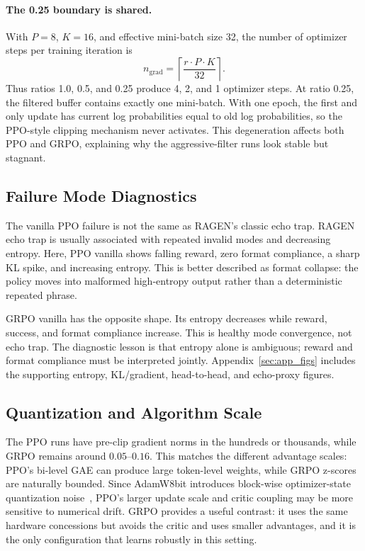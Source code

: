 \paragraph{The 0.25 boundary is shared.}
With \(P=8\), \(K=16\), and effective mini-batch size 32, the number of optimizer steps per training iteration is
\begin{equation}
n_{\mathrm{grad}} =
\left\lceil \frac{r \cdot P \cdot K}{32} \right\rceil.
\end{equation}
Thus ratios 1.0, 0.5, and 0.25 produce 4, 2, and 1 optimizer steps. At ratio 0.25, the filtered buffer contains exactly one mini-batch. With one epoch, the first and only update has current log probabilities equal to old log probabilities, so the PPO-style clipping mechanism never activates. This degeneration affects both PPO and GRPO, explaining why the aggressive-filter runs look stable but stagnant.

\subsection{Failure Mode Diagnostics}

The vanilla PPO failure is not the same as RAGEN's classic echo trap. RAGEN echo trap is usually associated with repeated invalid modes and decreasing entropy. Here, PPO vanilla shows falling reward, zero format compliance, a sharp KL spike, and increasing entropy. This is better described as format collapse: the policy moves into malformed high-entropy output rather than a deterministic repeated phrase.

GRPO vanilla has the opposite shape. Its entropy decreases while reward, success, and format compliance increase. This is healthy mode convergence, not echo trap. The diagnostic lesson is that entropy alone is ambiguous; reward and format compliance must be interpreted jointly. Appendix~\ref{sec:app_figs} includes the supporting entropy, KL/gradient, head-to-head, and echo-proxy figures.

\subsection{Quantization and Algorithm Scale}

The PPO runs have pre-clip gradient norms in the hundreds or thousands, while GRPO remains around \(0.05\)--\(0.16\). This matches the different advantage scales: PPO's bi-level GAE can produce large token-level weights, while GRPO z-scores are naturally bounded. Since AdamW8bit introduces block-wise optimizer-state quantization noise~\citep{dettmers2022optimizers}, PPO's larger update scale and critic coupling may be more sensitive to numerical drift. GRPO provides a useful contrast: it uses the same hardware concessions but avoids the critic and uses smaller advantages, and it is the only configuration that learns robustly in this setting.
